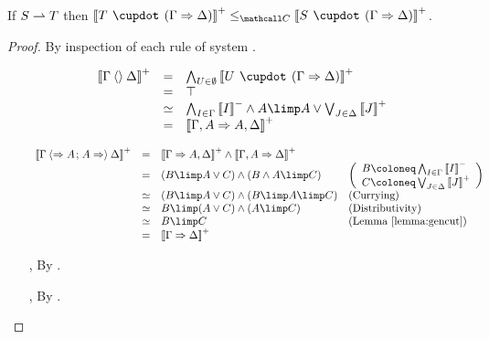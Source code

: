 \begin{lemma}
  
  If $S \rightharpoonup T$ then $\psint{T \mix (\Gamma \seq \Delta)} \sementC \psint{S
  \mix (\Gamma \seq \Delta)}$.
\end{lemma}
\begin{proof}
  By inspection of each rule of system .
  \def\arraystretch{1.25}
  \begin{itemize}
    \item[\rnmsf{i{\downarrow}}]
    $$
    \begin{array}{rcll}
      \psint{\Gamma \piq{} \Delta}
      &=& \bigwedge_{U \in \emptyset}{\psint{U \mix (\Gamma \seq \Delta)}} &\\
      &=& \top & \\
      &\semequiv& \bigwedge_{I \in \Gamma}{\nsint{I}} \wedge A \limp A \lor \bigvee_{J \in \Delta}{\psint{J}} &\\
      &=& \psint{\Gamma, A \seq A, \Delta}
    \end{array}
    $$
    \item[\rnmsf{i{\uparrow}}]
    $$
    \begin{array}{rcll}
      \psint{\Gamma \piq{\seq A \sep A \seq} \Delta}
      &=& \psint{\Gamma \seq A, \Delta} \wedge \psint{\Gamma, A \seq \Delta} & \\
      &=& (B \limp A \lor C) \land (B \land A \limp C) &
        \left(
        \begin{array}{l}
          B \coloneq \bigwedge_{I \in \Gamma}{\nsint{I}} \\
          C \coloneq \bigvee_{J \in \Delta}{\psint{J}} \\
        \end{array}
        \right)\\
      &\semequiv& (B \limp A \lor C) \wedge (B \limp A \limp C) &\text{(Currying)}\\
      &\semequiv& B \limp (A \lor C) \wedge (A \limp C) &\text{(Distributivity)}\\
      &\semequiv& B \limp C &\text{(\reflemma{gencut})}\\
      &=& \psint{\Gamma \seq \Delta} & \\
    \end{array}
    $$
    \item[{\rnmsf{w{-}}}, {\rnmsf{w{+}}}] By .
    \item[{\rnmsf{c{-}}}, {\rnmsf{c{+}}}] By .

\end{itemize}
\end{proof}
